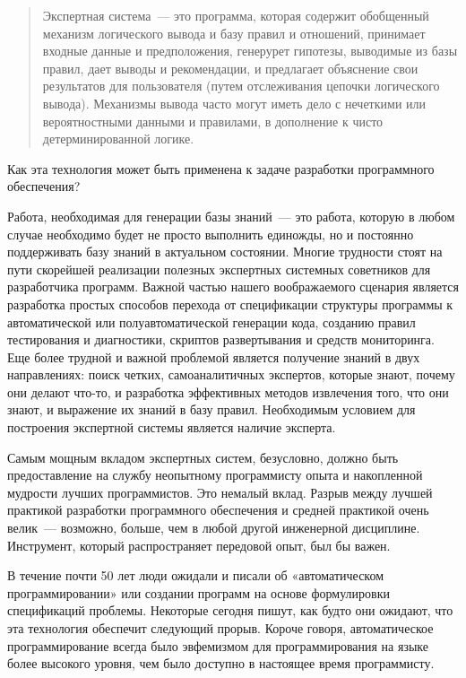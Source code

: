 \begin{quotation}\noindent
Экспертная система\ --- это программа, которая содержит обобщенный механизм
логического вывода и базу правил и отношений, принимает входные данные и
предположения, генерурет гипотезы, выводимые из базы правил, дает выводы и
рекомендации, и предлагает объяснение свои результатов для пользователя (путем
отслеживания цепочки логического вывода). Механизмы вывода часто могут иметь
дело с нечеткими или вероятностными данными и правилами, в дополнение к чисто
детерминированной логике.
\end{quotation}

Как эта технология может быть применена к задаче разработки программного
обеспечения?

Работа, необходимая для генерации базы знаний\ --- это работа, которую в любом
случае необходимо будет не просто выполнить единожды, но и постоянно
поддерживать базу знаний в актуальном состоянии. Многие трудности стоят на пути
скорейшей реализации полезных экспертных системных советников для разработчика
программ. Важной частью нашего воображаемого сценария является разработка
простых способов перехода от спецификации структуры программы к автоматической
или полуавтоматической генерации кода, созданию правил тестирования и
диагностики, скриптов развертывания и средств мониторинга. Еще более трудной и
важной проблемой является получение знаний в двух направлениях: поиск четких,
самоаналитичных экспертов, которые знают, почему они делают что-то, и разработка
эффективных методов извлечения того, что они знают, и выражение их знаний в базу
правил. Необходимым условием для построения экспертной системы является наличие
эксперта.

Самым мощным вкладом экспертных систем, безусловно, должно быть предоставление
на службу неопытному программисту опыта и накопленной мудрости лучших
программистов. Это немалый вклад. Разрыв между лучшей практикой разработки
программного обеспечения и средней практикой очень велик\ --- возможно, больше,
чем в любой другой инженерной дисциплине. Инструмент, который распространяет
передовой опыт, был бы важен.

В течение почти 50 лет люди ожидали и писали об «автоматическом
программировании» или создании программ на основе формулировки спецификаций
проблемы. Некоторые сегодня пишут, как будто они ожидают, что эта технология
обеспечит следующий прорыв. Короче говоря, автоматическое программирование
всегда было эвфемизмом для программирования на языке более высокого уровня, чем
было доступно в настоящее время программисту.

